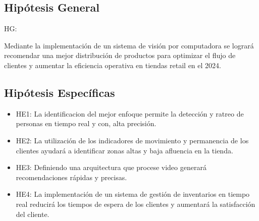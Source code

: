 \subsection{Hipótesis General}
HG: \newcommand{\HipotesisGeneral}{
Mediante la implementación de un sistema de visión por computadora se logrará recomendar una mejor distribución de productos para optimizar el flujo de clientes y aumentar la eficiencia operativa en tiendas retail en el 2024.
}
\HipotesisGeneral


\subsection{Hipótesis Específicas}
\newcommand{\Hone}{
La identificacion del mejor enfoque permite la detección y ratreo de personas en tiempo real y con, alta precisión.
}
\newcommand{\Htwo}{
La utilización de los indicadores de movimiento y permanencia de los clientes ayudará a identificar zonas altas y baja afluencia en la tienda.
}
\newcommand{\Hthree}{
Definiendo una arquitectura que procese video generará recomendaciones rápidas y precisas.
}
\newcommand{\Hfour}{
La implementación de un sistema de gestión de inventarios en tiempo real reducirá los tiempos de espera de los clientes y aumentará la satisfacción del cliente.
}

\begin{itemize}
	\item HE1: {\Hone}
	\item HE2: {\Htwo}
	\item HE3: {\Hthree}
	\item HE4: {\Hfour}
\end{itemize}